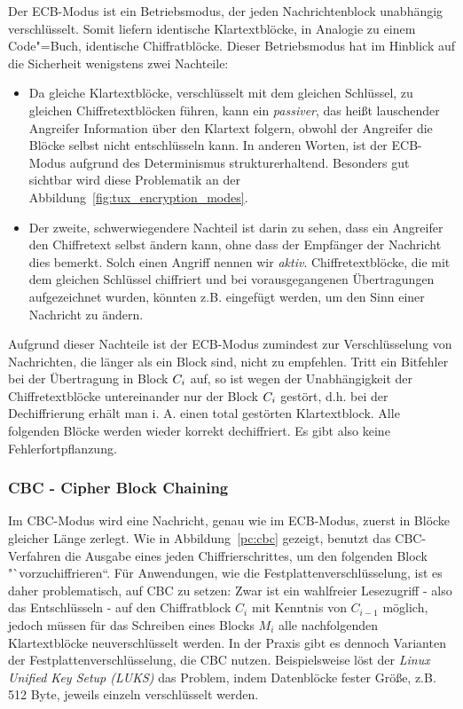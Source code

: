 Der ECB-Modus ist ein Betriebsmodus, der jeden Nachrichtenblock unabhängig verschlüsselt. Somit liefern identische Klartextblöcke, in Analogie zu einem Code"=Buch, identische Chiffratblöcke. Dieser Betriebsmodus hat im Hinblick auf die Sicherheit wenigstens zwei Nachteile:
\begin{itemize}
	\item Da gleiche Klartextblöcke, verschlüsselt mit dem gleichen Schlüssel, zu gleichen Chiffretextblöcken führen, kann ein \emph{passiver}, das heißt lauschender Angreifer
	Information über den Klartext folgern, obwohl der Angreifer die Blöcke selbst nicht entschlüsseln kann. In anderen Worten, ist der ECB-Modus aufgrund des Determinismus strukturerhaltend. Besonders gut sichtbar wird diese Problematik an der Abbildung~\ref{fig:tux_encryption_modes}.
	\item Der zweite, schwerwiegendere Nachteil ist darin zu sehen, dass ein Angreifer den Chiffretext selbst ändern kann, ohne dass der Empfänger der
	Nachricht dies bemerkt. Solch einen Angriff nennen wir \emph{aktiv}. Chiffretextblöcke, die mit dem gleichen Schlüssel chiffriert und bei vorausgegangenen Übertragungen aufgezeichnet wurden, könnten
	z.B. eingefügt werden, um den Sinn einer Nachricht zu ändern.
\end{itemize}

Aufgrund dieser Nachteile ist der ECB-Modus zumindest zur Verschlüsselung von Nachrichten, die länger als ein Block sind, nicht zu empfehlen.
Tritt ein Bitfehler bei der Übertragung in Block $C_i$ auf, so ist wegen der Unabhängigkeit der Chiffretextblöcke untereinander nur der Block
$C_i$ gestört, d.h. bei der Dechiffrierung erhält man i. A. einen total gestörten Klartextblock. Alle folgenden Blöcke werden wieder korrekt
dechiffriert. Es gibt also keine Fehlerfortpflanzung.

\subsubsection{CBC - Cipher Block Chaining}\label{ssec:cbc}
Im CBC-Modus wird eine Nachricht, genau wie im ECB-Modus, zuerst in Blöcke gleicher Länge zerlegt. Wie in Abbildung~\ref{pc:cbc} gezeigt, benutzt das CBC-Verfahren die Ausgabe eines jeden Chiffrierschrittes, um den folgenden Block "`vorzuchiffrieren``.
Für Anwendungen, wie die Festplattenverschlüsselung, ist es daher problematisch, auf CBC zu setzen: Zwar ist ein wahlfreier Lesezugriff - also das Entschlüsseln - auf den Chiffratblock $C_i$ mit Kenntnis von $C_{i-1}$ möglich, jedoch müssen für das Schreiben eines Blocks $M_i$ alle nachfolgenden Klartextblöcke neuverschlüsselt werden. In der Praxis gibt es dennoch Varianten der Festplattenverschlüsselung, die CBC nutzen.
Beispielsweise löst der \textit{Linux Unified Key Setup (LUKS)} das Problem, indem Datenblöcke fester Größe, z.B. 512 Byte, jeweils einzeln verschlüsselt werden.

